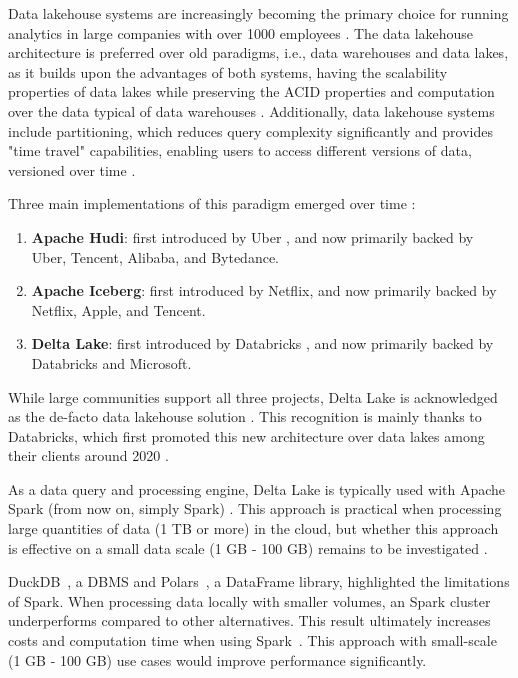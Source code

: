 Data lakehouse systems are increasingly becoming the primary choice for running analytics in large companies with over 1000 employees \cite{StateDataLakehouse2024}. The data lakehouse architecture \cite{lakehouse2021} is preferred over old paradigms, i.e., data warehouses and data lakes, as it builds upon the advantages of both systems, having the scalability properties of data lakes while preserving the \gls{ACID} properties and computation over the data typical of data warehouses \cite{lakehouse2021}. Additionally, data lakehouse systems include partitioning, which reduces query complexity significantly and provides "time travel" capabilities, enabling users to access different versions of data, versioned over time \cite{crociDataLakehouseHype2022}.

Three main implementations of this paradigm emerged over time \cite{ApacheHudiVs}: 
\begin{enumerate}
    \item \textbf{Apache Hudi}: first introduced by Uber \cite{rajaperumalUberEngineeringIncremental2017}, and now primarily backed by Uber, Tencent, Alibaba, and Bytedance.
    \item \textbf{Apache Iceberg}: first introduced by Netflix, and now primarily backed by Netflix, Apple, and Tencent.
    \item \textbf{Delta Lake}: first introduced by Databricks \cite{armbrustDeltaLakeHighperformance2020}, and now primarily backed by Databricks and Microsoft.
\end{enumerate}

While large communities support all three projects, Delta Lake is acknowledged as the de-facto data lakehouse solution \cite{ApacheHudiVs}. This recognition is mainly thanks to Databricks, which first promoted this new architecture over data lakes among their clients around 2020 \cite{armbrustDeltaLakeHighperformance2020}.

As a data query and processing engine, Delta Lake is typically used with Apache Spark (from now on, simply Spark) \cite{zahariaApacheSparkUnified2016}. This approach is practical when processing large quantities of data (1 TB or more) in the cloud, but whether this approach is effective on a small data scale (1 GB - 100 GB) remains to be investigated \cite{Khazanchi1801362}.

DuckDB~\cite{raasveldtDuckDBEmbeddableAnalytical2019}, a \gls{DBMS} and Polars~\cite{vinkWroteOneFastest2021}, a DataFrame library, highlighted the limitations of Spark. When processing data locally with smaller volumes, an Spark cluster underperforms compared to other alternatives. This result ultimately increases costs and computation time when using Spark~\cite{BenchmarkResultsSpark,ebergenUpdatesH2OAi2023}. This approach with small-scale (1 GB - 100 GB) use cases would improve performance significantly.

